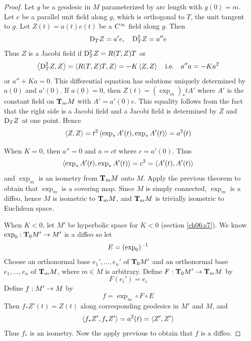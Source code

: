 \documentclass[../main]{subfiles}
\begin{document}
\begin{proof}
Let $g$ be a geodesic in $M$ parameterized by arc length with $g(0)=m$. Let $e$ be a parallel unit field along $g$, which is orthogonal to $T$, the unit tangent to $g$. Let $Z(t)=a(t)e(t)$ be a $\CInfty$ field along $g$. Then
\[\D_TZ=a'e,
\quad \D_T^2Z=a''e\]
Thus $Z$ is a Jacobi field if $\D_T^2Z=R(T,Z)T$ or
\[\ip{\D_T^2Z}{Z} = \ip{R(T,Z)T}{Z}
= -K\ip ZZ
\quad \text{i.e.}
\quad a''a = -Ka^2\]
or $a''+Ka=0$. This differential equation has solutions uniquely determined by $a(0)$ and $a'(0)$. If $a(0)=0$, then $Z(t)=(\exp_m)_*tA'$ where $A'$ is the constant field on $\ts Mm$ with $A'=a'(0)e$. This equality follows from the fact that the right side is a Jacobi field and a Jacobi field is determined by $Z$ and $\D_TZ$ at one point. Hence
\[\ip ZZ = t^2\ip{\exp_*A'(t)}{\exp_*A'(t)}
= a^2(t)\]

When $K=0$, then $a''=0$ and $a=ct$ where $c=a'(0)$. Thus
\[\ip{\exp_*A'(t)}{\exp_*A'(t)} = c^2
= \ip{A'(t)}{A'(t)}\]
and $\exp_m$ is an isometry from $\ts Mm$ onto $M$. Apply the previous theorem to obtain that $\exp_m$ is a covering map. Since $M$ is simply connected, $\exp_m$ is a diffeo, hence $M$ is isometric to $\ts Mm$, and $\ts Mm$ is trivially isometric to Euclidean space.

When $K<0$, let $M'$ be hyperbolic space for $K<0$ (section \ref{ch06:s7}). We know $\exp_0:\ts{M'}{0}\functionMaps M'$ is a diffeo so let
\[E=(\exp_0)\inv\]
Choose an orthonormal base $e_1',\ldots,e_n'$ of $\ts{M'}{0}$ and an orthonormal base $e_1,\ldots,e_n$ of $\ts Mm$, where $m\in M$ is arbitrary. Define $F:\ts{M'}{0}\functionMaps\ts Mm$ by
\[F(e_i')=e_i\]
Define $f:M'\functionMaps M$ by
\[f=\exp_m\circ F\circ E\]
Then $f_*Z'(t)=Z(t)$ along corresponding geodesics in $M'$ and $M$, and
\[\ip{f_*Z'}{f_*Z'} = a^2(t)
= \ip{Z'}{Z'}\]
Thus $f_*$ is an isometry. Now the apply previous to obtain that $f$ is a diffeo.


\end{proof}
\end{document}
